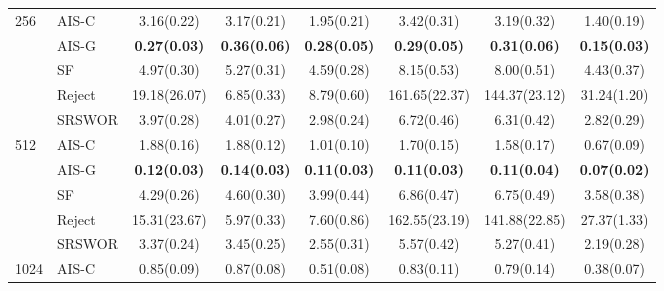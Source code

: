 \begin{tabular}{llcccccc}
  \midrule
  \multirow{5}{*}{256}   & AIS-C                 & {3.16(0.22)}          & {3.17(0.21)}          & {1.95(0.21)}          & {3.42(0.31)}          & {3.19(0.32)}          & {1.40(0.19)}          \\
                         & AIS-G                 & \textbf{0.27(0.03)}   & \textbf{0.36(0.06)}   & \textbf{0.28(0.05)}   & \textbf{0.29(0.05)}   & \textbf{0.31(0.06)}   & \textbf{0.15(0.03)}   \\
                         & SF                    & {4.97(0.30)}          & {5.27(0.31)}          & {4.59(0.28)}          & {8.15(0.53)}          & {8.00(0.51)}          & {4.43(0.37)}          \\
                         & Reject                & {19.18(26.07)}        & {6.85(0.33)}          & {8.79(0.60)}          & {161.65(22.37)}       & {144.37(23.12)}       & {31.24(1.20)}         \\
                         & SRSWOR                & {3.97(0.28)}          & {4.01(0.27)}          & {2.98(0.24)}          & {6.72(0.46)}          & {6.31(0.42)}          & {2.82(0.29)}          \\
  \midrule
  \multirow{5}{*}{512}   & AIS-C                 & {1.88(0.16)}          & {1.88(0.12)}          & {1.01(0.10)}          & {1.70(0.15)}          & {1.58(0.17)}          & {0.67(0.09)}          \\
                         & AIS-G                 & \textbf{0.12(0.03)}   & \textbf{0.14(0.03)}   & \textbf{0.11(0.03)}   & \textbf{0.11(0.03)}   & \textbf{0.11(0.04)}   & \textbf{0.07(0.02)}   \\
                         & SF                    & {4.29(0.26)}          & {4.60(0.30)}          & {3.99(0.44)}          & {6.86(0.47)}          & {6.75(0.49)}          & {3.58(0.38)}          \\
                         & Reject                & {15.31(23.67)}        & {5.97(0.33)}          & {7.60(0.86)}          & {162.55(23.19)}       & {141.88(22.85)}       & {27.37(1.33)}         \\
                         & SRSWOR                & {3.37(0.24)}          & {3.45(0.25)}          & {2.55(0.31)}          & {5.57(0.42)}          & {5.27(0.41)}          & {2.19(0.28)}          \\
  \midrule
  \multirow{5}{*}{1024}  & AIS-C                 & {0.85(0.09)}          & {0.87(0.08)}          & {0.51(0.08)}          & {0.83(0.11)}          & {0.79(0.14)}          & {0.38(0.07)}          \\

\end{tabular}
